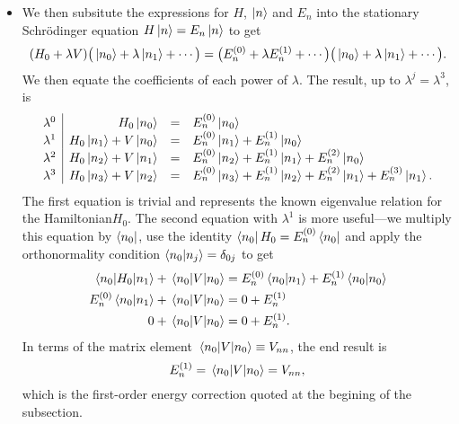 \documentclass[11pt, a4paper]{article}
\newcommand{\Schro}{Schr\"{o}dinger\xspace}
\newcommand{\Ham}{Hamiltonian\xspace}
\begin{document}
\begin{itemize}
    \item We then subsitute the expressions for $ H $, $ \ket{n} $ and $ E_{n} $ into the stationary \Schro equation $ H \ket{n} = E_{n} \ket{n} $ to get
    \begin{equation*}
        (H_{0} + \lambda V)\big( \ket{n_{0}} + \lambda \ket{n_{1}}  + \cdots \big) = \big( E_{n}^{(0)} + \lambda E_{n}^{(1)} + \cdots \big)\big( \ket{n_{0}} + \lambda \ket{n_{1}} + \cdots \big).
    \end{equation*}
    We then equate the coefficients of each power of $ \lambda $. The result, up to $ \lambda^{j} = \lambda^{3} $, is
    \begin{equation*}
        \begin{array}{l|r c l}
            \lambda^{0} & H_{0} \ket{n_{0}} & = & E_{n}^{(0)} \ket{n_{0}}\\
            \lambda^{1} & H_{0}\ket{n_{1}} + V \ket{n_{0}} & = & E_{n}^{(0)}\ket{n_{1}} + E_{n}^{(1)}\ket{n_{0}}\\
            \lambda^{2} & H_{0}\ket{n_{2}} + V \ket{n_{1}} & = & E_{n}^{(0)}\ket{n_{2}} + E_{n}^{(1)}\ket{n_{1}} + E_{n}^{(2)}\ket{n_{0}}\\
            \lambda^{3} & H_{0}\ket{n_{3}} + V \ket{n_{2}} & = & E_{n}^{(0)}\ket{n_{3}} + E_{n}^{(1)}\ket{n_{2}} + E_{n}^{(2)}\ket{n_{1}} + E_{n}^{(3)}\ket{n_{1}}.
        \end{array}
    \end{equation*}
    The first equation is trivial and represents the known eigenvalue relation for the \Ham $ H_{0} $. The second equation with $ \lambda^{1} $ is more useful---we multiply this equation by $ \bra{n_{0}} $, use the identity $ \bra{n_{0}} H_{0} = E_{n}^{(0)}\bra{n_{0}} $ and apply the orthonormality condition $ \braket{n_{0}}{n_{j}} = \delta_{0j} $ to get
    \begin{align*}
        \mel{n_{0}}{H_{0}}{n_{1}} + \mel{n_{0}}{V}{n_{0}} &= E_{n}^{(0)}\braket{n_{0}}{n_{1}} + E_{n}^{(1)}\braket{n_{0}}{n_{0}}\\
        E_{n}^{(0)} \braket{n_{0}}{n_{1}} + \mel{n_{0}}{V}{n_{0}} &= 0 + E_{n}^{(1)}\\
        0 + \mel{n_{0}}{V}{n_{0}} &= 0 + E_{n}^{(1)}.
    \end{align*}
    In terms of the matrix element $ \mel{n_{0}}{V}{n_{0}} \equiv V_{nn} $, the end result is
     \begin{equation*}
         E_{n}^{(1)} = \mel{n_{0}}{V}{n_{0}} = V_{nn},
     \end{equation*}
     which is the first-order energy correction quoted at the begining of the subsection.

\end{itemize}
\end{document}
